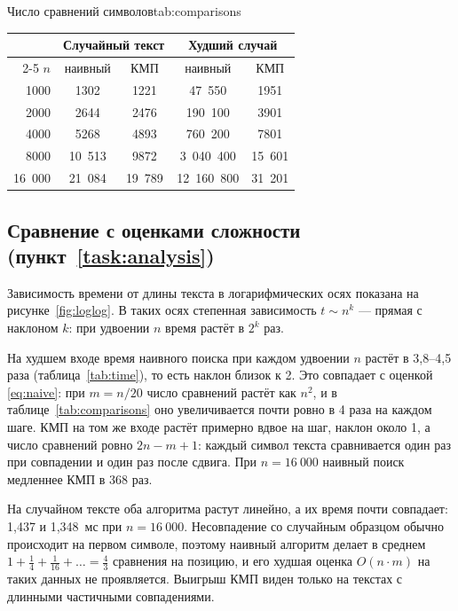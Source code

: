 \begin{bbttable}{Число сравнений символов}{tab:comparisons}
  \begin{tabular}{|r|c|c|c|c|}
    \hline
    & \multicolumn{2}{c|}{Случайный текст} & \multicolumn{2}{c|}{Худший случай} \\ \cline{2-5}
    $n$ & наивный & КМП & наивный & КМП \\ \hline
    1000    & 1302    & 1221    & 47~550     & 1951    \\ \hline
    2000    & 2644    & 2476    & 190~100    & 3901    \\ \hline
    4000    & 5268    & 4893    & 760~200    & 7801    \\ \hline
    8000    & 10~513  & 9872    & 3~040~400  & 15~601  \\ \hline
    16~000  & 21~084  & 19~789  & 12~160~800 & 31~201  \\ \hline
  \end{tabular}
\end{bbttable}

\subsection{Сравнение с оценками сложности (пункт~\ref{task:analysis})}
Зависимость времени от длины текста в логарифмических осях показана на
рисунке~\ref{fig:loglog}. В таких осях степенная зависимость $t \sim n^k$ — прямая с
наклоном $k$: при удвоении $n$ время растёт в $2^k$ раз.


На худшем входе время наивного поиска при каждом удвоении $n$ растёт в 3,8–4,5 раза
(таблица~\ref{tab:time}), то есть наклон близок к 2. Это совпадает с оценкой
\eqref{eq:naive}: при $m = n/20$ число сравнений растёт как $n^2$, и в
таблице~\ref{tab:comparisons} оно увеличивается почти ровно в 4 раза на каждом шаге. КМП на
том же входе растёт примерно вдвое на шаг, наклон около 1, а число сравнений ровно
$2n - m + 1$: каждый символ текста сравнивается один раз при совпадении и один раз после
сдвига. При $n = 16~000$ наивный поиск медленнее КМП в 368 раз.

На случайном тексте оба алгоритма растут линейно, а их время почти совпадает: 1,437 и
1,348~мс при $n = 16~000$. Несовпадение со случайным образцом обычно происходит на первом
символе, поэтому наивный алгоритм делает в среднем
$1 + \frac{1}{4} + \frac{1}{16} + \ldots = \frac{4}{3}$ сравнения на позицию, и его худшая
оценка $O(n \cdot m)$ на таких данных не проявляется. Выигрыш КМП виден только на текстах с
длинными частичными совпадениями.


